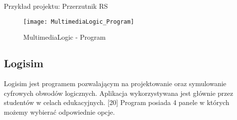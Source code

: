 \documentclass[12pt, a4paper, onside, polish]{article}				%
\begin{document}
Przykład projektu: Przerzutnik RS
  	\begin{figure}[H]
  	  {\centering \texttt{[image: MultimediaLogic\_Program]} \caption{MultimediaLogic - Program}}\vspace{5mm}
  	 \end{figure}
\cleardoublepage

\subsection{Logisim}
\hspace{\parindent}
Logisim jest programem pozwalającym na projektowanie oraz symulowanie cyfrowych obwodów logicznych. Aplikacja wykorzystywana jest głównie przez studentów w celach edukacyjnych. [20]  \newline\newline
Program posiada 4 panele w których możemy wybierać odpowiednie opcje.
\end{document}
